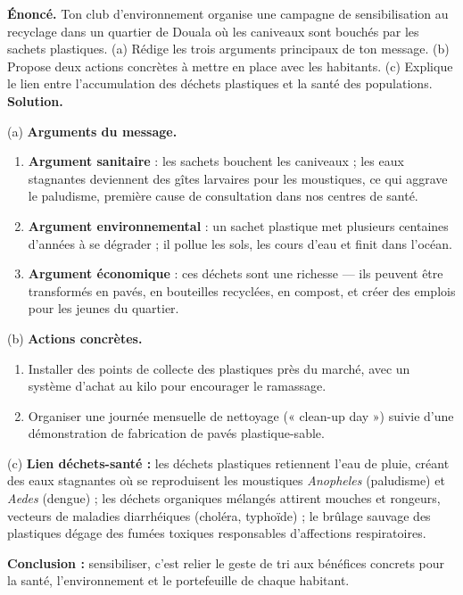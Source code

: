 \documentclass[11pt]{article}
\begin{document}
\begin{exoresolu}
\textbf{Énoncé.} Ton club d'environnement organise une campagne de sensibilisation au recyclage dans un quartier de Douala où les caniveaux sont bouchés par les sachets plastiques. (a) Rédige les trois arguments principaux de ton message. (b) Propose deux actions concrètes à mettre en place avec les habitants. (c) Explique le lien entre l'accumulation des déchets plastiques et la santé des populations.
\tcblower
\textbf{Solution.}

(a) \textbf{Arguments du message.}
\begin{enumerate}
\item \textbf{Argument sanitaire} : les sachets bouchent les caniveaux ; les eaux stagnantes deviennent des gîtes larvaires pour les moustiques, ce qui aggrave le paludisme, première cause de consultation dans nos centres de santé.
\item \textbf{Argument environnemental} : un sachet plastique met plusieurs centaines d'années à se dégrader ; il pollue les sols, les cours d'eau et finit dans l'océan.
\item \textbf{Argument économique} : ces déchets sont une richesse — ils peuvent être transformés en pavés, en bouteilles recyclées, en compost, et créer des emplois pour les jeunes du quartier.
\end{enumerate}

(b) \textbf{Actions concrètes.}
\begin{enumerate}
\item Installer des points de collecte des plastiques près du marché, avec un système d'achat au kilo pour encourager le ramassage.
\item Organiser une journée mensuelle de nettoyage (« clean-up day ») suivie d'une démonstration de fabrication de pavés plastique-sable.
\end{enumerate}

(c) \textbf{Lien déchets-santé :} les déchets plastiques retiennent l'eau de pluie, créant des eaux stagnantes où se reproduisent les moustiques \emph{Anopheles} (paludisme) et \emph{Aedes} (dengue) ; les déchets organiques mélangés attirent mouches et rongeurs, vecteurs de maladies diarrhéiques (choléra, typhoïde) ; le brûlage sauvage des plastiques dégage des fumées toxiques responsables d'affections respiratoires.

\textbf{Conclusion :} sensibiliser, c'est relier le geste de tri aux bénéfices concrets pour la santé, l'environnement et le portefeuille de chaque habitant.
\end{exoresolu}
\end{document}
